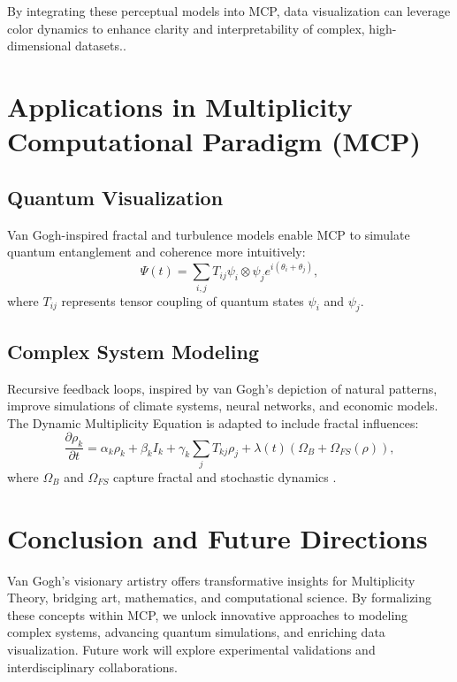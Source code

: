 \documentclass{article}
\theoremstyle{plain}
\begin{document}
By integrating these perceptual models into MCP, data visualization can leverage color dynamics to enhance clarity and interpretability of complex, high-dimensional datasets.\cite{Perception2024}.

\section{Applications in Multiplicity Computational Paradigm (MCP)}

\subsection{Quantum Visualization}
Van Gogh-inspired fractal and turbulence models enable MCP to simulate quantum entanglement and coherence more intuitively:
\begin{equation}
\Psi(t) = \sum_{i,j} T_{ij} \psi_i \otimes \psi_j e^{i(\theta_i + \theta_j)},
\end{equation}
where $T_{ij}$ represents tensor coupling of quantum states $\psi_i$ and $\psi_j$.

\subsection{Complex System Modeling}
Recursive feedback loops, inspired by van Gogh's depiction of natural patterns, improve simulations of climate systems, neural networks, and economic models. The Dynamic Multiplicity Equation is adapted to include fractal influences:
\begin{equation}
\frac{\partial \rho_k}{\partial t} = \alpha_k \rho_k + \beta_k I_k + \gamma_k \sum_j T_{kj} \rho_j + \lambda(t) (\Omega_B + \Omega_{FS}(\rho)),
\end{equation}
where $\Omega_B$ and $\Omega_{FS}$ capture fractal and stochastic dynamics \cite{Dynamic2024}.

\section{Conclusion and Future Directions}
Van Gogh's visionary artistry offers transformative insights for Multiplicity Theory, bridging art, mathematics, and computational science. By formalizing these concepts within MCP, we unlock innovative approaches to modeling complex systems, advancing quantum simulations, and enriching data visualization. Future work will explore experimental validations and interdisciplinary collaborations.



\nocite{*}


\end{document}
